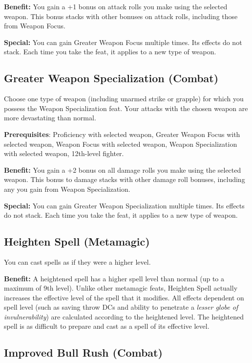 \textbf{Benefit:} You gain a +1 bonus on attack rolls you make using the selected weapon. This bonus stacks with other bonuses on attack rolls, including those from Weapon Focus.
				
\textbf{Special:} You can gain Greater Weapon Focus multiple times. Its effects do not stack. Each time you take the feat, it applies to a new type of weapon.
				
\subsection{Greater Weapon Specialization (Combat)}

				
Choose one type of weapon (including unarmed strike or grapple) for which you possess the Weapon Specialization feat. Your attacks with the chosen weapon are more devastating than normal.

\textbf{ Prerequisites}: Proficiency with selected weapon, Greater Weapon Focus with selected weapon, Weapon Focus with selected weapon, Weapon Specialization with selected weapon, 12th-level fighter.
				
\textbf{Benefit:} You gain a +2 bonus on all damage rolls you make using the selected weapon. This bonus to damage stacks with other damage roll bonuses, including any you gain from Weapon Specialization.
				
\textbf{Special:} You can gain Greater Weapon Specialization multiple times. Its effects do not stack. Each time you take the feat, it applies to a new type of weapon.
				
\subsection{Heighten Spell (Metamagic)}

				
You can cast spells as if they were a higher level.
				
\textbf{Benefit:} A heightened spell has a higher spell level than normal (up to a maximum of 9th level). Unlike other metamagic feats, Heighten Spell actually increases the effective level of the spell that it modifies. All effects dependent on spell level (such as saving throw DCs and ability to penetrate a \textit{lesser globe of invulnerability}) are calculated according to the heightened level. The heightened spell is as difficult to prepare and cast as a spell of its effective level. 
				
\subsection{Improved Bull Rush (Combat)}

